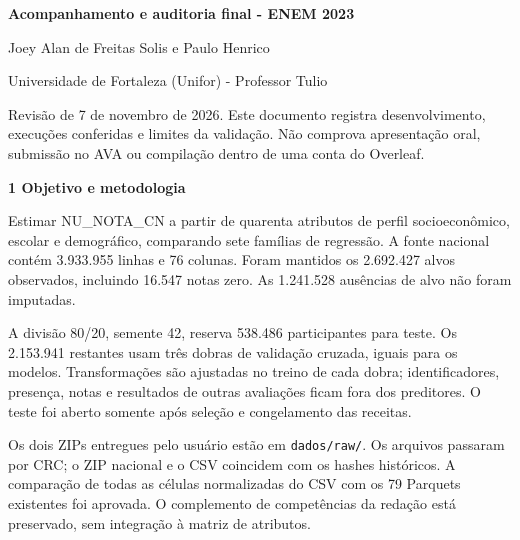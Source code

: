 \documentclass[12pt,a4paper]{article}
\newcommand{\heading}[1]{\par\Needspace{4\baselineskip}\noindent\textbf{#1}\par\vspace{5pt}}
\begin{document}
\begin{center}\large\textbf{Acompanhamento e auditoria final - ENEM 2023}\end{center}
Joey Alan de Freitas Solis e Paulo Henrico


Universidade de Fortaleza (Unifor) - Professor Tulio


Revisão de 7 de novembro de 2026. Este documento registra desenvolvimento, execuções conferidas e limites da validação. Não comprova apresentação oral, submissão no AVA ou compilação dentro de uma conta do Overleaf.


\heading{1 Objetivo e metodologia}
Estimar NU\_NOTA\_CN a partir de quarenta atributos de perfil socioeconômico, escolar e demográfico, comparando sete famílias de regressão. A fonte nacional contém 3.933.955 linhas e 76 colunas. Foram mantidos os 2.692.427 alvos observados, incluindo 16.547 notas zero. As 1.241.528 ausências de alvo não foram imputadas.


A divisão 80/20, semente 42, reserva 538.486 participantes para teste. Os 2.153.941 restantes usam três dobras de validação cruzada, iguais para os modelos. Transformações são ajustadas no treino de cada dobra; identificadores, presença, notas e resultados de outras avaliações ficam fora dos preditores. O teste foi aberto somente após seleção e congelamento das receitas.


Os dois ZIPs entregues pelo usuário estão em \nolinkurl{dados/raw/}. Os arquivos passaram por CRC; o ZIP nacional e o CSV coincidem com os hashes históricos. A comparação de todas as células normalizadas do CSV com os 79 Parquets existentes foi aprovada. O complemento de competências da redação está preservado, sem integração à matriz de atributos.
\end{document}
